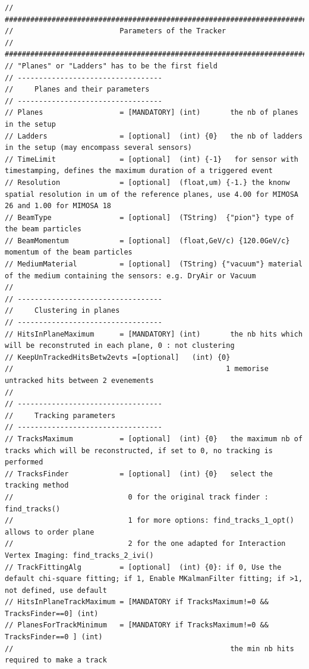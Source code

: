 \documentclass[a4paper, 12pt, twoside]{article}
\begin{document}
\begin{verbatim}
// #############################################################################
//                         Parameters of the Tracker
// #############################################################################
// "Planes" or "Ladders" has to be the first field
// ----------------------------------
//     Planes and their parameters
// ----------------------------------
// Planes                  = [MANDATORY] (int)       the nb of planes in the setup
// Ladders                 = [optional]  (int) {0}   the nb of ladders in the setup (may encompass several sensors)
// TimeLimit               = [optional]  (int) {-1}   for sensor with timestamping, defines the maximum duration of a triggered event
// Resolution              = [optional]  (float,um) {-1.} the knonw spatial resolution in um of the reference planes, use 4.00 for MIMOSA 26 and 1.00 for MIMOSA 18
// BeamType                = [optional]  (TString)  {"pion"} type of the beam particles
// BeamMomentum            = [optional]  (float,GeV/c) {120.0GeV/c} momentum of the beam particles
// MediumMaterial          = [optional]  (TString) {"vacuum"} material of the medium containing the sensors: e.g. DryAir or Vacuum
//
// ----------------------------------
//     Clustering in planes
// ----------------------------------
// HitsInPlaneMaximum      = [MANDATORY] (int)       the nb hits which will be reconstruted in each plane, 0 : not clustering
// KeepUnTrackedHitsBetw2evts =[optional]   (int) {0}
//                                                  1 memorise untracked hits between 2 evenements
//
// ----------------------------------
//     Tracking parameters
// ----------------------------------
// TracksMaximum           = [optional]  (int) {0}   the maximum nb of tracks which will be reconstructed, if set to 0, no tracking is performed
// TracksFinder            = [optional]  (int) {0}   select the tracking method
//                           0 for the original track finder : find_tracks()
//                           1 for more options: find_tracks_1_opt() allows to order plane
//                           2 for the one adapted for Interaction Vertex Imaging: find_tracks_2_ivi()
// TrackFittingAlg         = [optional]  (int) {0}: if 0, Use the default chi-square fitting; if 1, Enable MKalmanFilter fitting; if >1, not defined, use default
// HitsInPlaneTrackMaximum = [MANDATORY if TracksMaximum!=0 && TracksFinder==0] (int)
// PlanesForTrackMinimum   = [MANDATORY if TracksMaximum!=0 && TracksFinder==0 ] (int)
//                                                   the min nb hits required to make a track

\end{verbatim}
\end{document}

